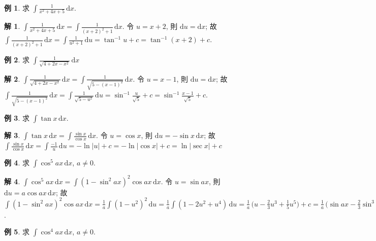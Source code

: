 \documentclass[12pt]{extarticle}
\newcommand{\ds}{\displaystyle}
\theoremstyle{definition}
\newtheorem*{ex}{例}
\newtheorem*{sol}{解}
\begin{document}
\begin{ex}
  求 $\ds\int\!\frac{1}{x^2 + 4x + 5}\,\text{d}x$. 
\end{ex}
\begin{sol}
  $\ds\int\!\frac{1}{x^2 + 4x + 5}\,\text{d}x = \int\!\frac{1}{(x + 2)^2 + 1}\,\text{d}x$. 令 $\ds u = x + 2$, 則 $\ds\text{d}u = \text{d}x$; 故 $\ds\int\!\frac{1}{(x + 2)^2 + 1}\,\text{d}x = \int\!\frac{1}{u^2 + 1}\,\text{d}u = \tan^{-1} u + c = \tan^{-1} (x+2) + c$. 
\end{sol}

\begin{ex}
  求 $\ds\int\!\frac{1}{\sqrt{4 + 2x - x^2}}\,\text{d}x$
\end{ex}
    
\begin{sol}
  $\ds\int\!\frac{1}{\sqrt{4 + 2x - x^2}}\,\text{d}x = \int\!\frac{1}{\sqrt{5 - (x - 1)^2}}\,\text{d}x$. 令 $u = x - 1$, 則 $\ds\text{d}u = \text{d}x$; 故 $\ds\int\!\frac{1}{\sqrt{5 - (x - 1)^2}}\,\text{d}x = \int\!\frac{1}{\sqrt{5 - u^2}}\,\text{d}u = \sin^{-1}\frac{u}{\sqrt{5}} + c = \sin^{-1}\frac{x - 1}{\sqrt{5}} + c$. 
\end{sol}

\begin{ex}
  求 $\ds\int\!\tan x\,\text{d}x$. 
\end{ex}

\begin{sol}
  $\ds\int\!\tan x\,\text{d}x = \int\!\frac{\sin x}{\cos x}\,\text{d}x$. 令 $u = \cos x$, 則 $\text{d}u = -\sin x\,\text{d}x$; 故 $\ds\int\!\frac{\sin x}{\cos x}\,\text{d}x = \int\!\frac{-1}{u}\,\text{d}u = -\ln|u| + c = -\ln|\cos x| + c = \ln|\sec x| + c$
\end{sol}

\begin{ex}
  求 $\ds\int\!\cos^5 ax\,\text{d}x$, $a\ne 0$.  
\end{ex}

\begin{sol}
  $\ds\int\!\cos^5 ax\,\text{d}x = \int(1-\sin^2 ax)^2\cos ax\,\text{d}x$. 令 $\ds u = \sin ax$, 則 $\ds\text{d}u = a\cos ax\,\text{d}x$; 故 $\ds\int(1-\sin^2 ax)^2\cos ax\,\text{d}x = \frac{1}{a}\int(1-u^2)^2\,\text{d}u = \frac{1}{a}\int(1 - 2u^2 + u^4)\,\text{d}u = \frac{1}{a}\,\Big(u - \frac{2}{3}u^3 + \frac{1}{5}u^5\Big) + c = \frac{1}{a}\,\Big(\sin ax - \frac{2}{3}\sin^3 ax + \frac{1}{5}\sin^5 ax\Big) + c$. 
\end{sol}

\begin{ex}
  求 $\ds\int\!\cos^4 ax\,\text{d}x$, $a\ne 0$. 
\end{ex}
   
\end{document}
